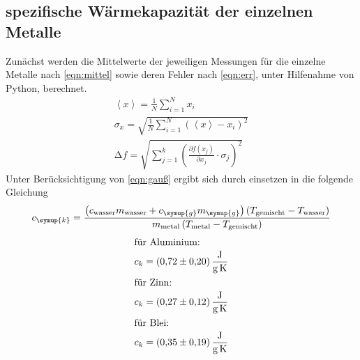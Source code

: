 \subsection{spezifische Wärmekapazität der einzelnen Metalle}
Zunächst werden die Mittelwerte der jeweiligen Messungen für die
einzelne Metalle nach \eqref{eqn:mittel} sowie deren Fehler nach \eqref{eqn:err}, unter Hilfenahme von
Python, berechnet.
\begin{gather}
  \left<x\right> = \frac{1}{N}\sum_{i=1}^N x_i
  \label{eqn:mittel}\\
  \sigma_x = \sqrt{\frac{1}{N}\sum_{i=1}^N \left(\left<x\right>-x_i\right)^2}
  \label{eqn:err}\\
  \increment f = \sqrt{\sum_{j=1}^k\left(\frac{\partial f\left(x_j\right)}{\partial x_j}\cdot\sigma_j\right)^{\!\!2}}
  \label{eqn:gauß}
\end{gather}
Unter Berücksichtigung von \eqref{eqn:gauß} ergibt sich durch einsetzen
in die folgende Gleichung
\begin{equation}
  c_\symup{k} = \frac{\left(c_\text{wasser}m_\text{wasser}+c_\symup{g}m_\symup{g}\right)
\left(T_\text{gemischt}-T_\text{wasser}\right)}{m_\text{metal}\left(T_\text{metal}-T_\text{gemischt}\right)}
\end{equation}
\begin{gather*}
  \intertext{für Aluminium:}
  c_k =\SI{0,72(20)}{\joule\per\gram\per\kelvin}\\
  \intertext{für Zinn:}
  c_k =\SI{0,27(12)}{\joule\per\gram\per\kelvin}\\
  \intertext{für Blei:}
  c_k =\SI{0,35(19)}{\joule\per\gram\per\kelvin}
\end{gather*}

